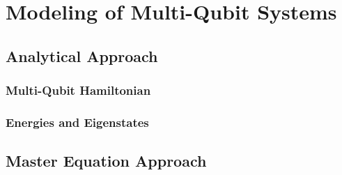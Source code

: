 \chapter{Modeling of Multi-Qubit Systems}


\section{Analytical Approach}

\subsection{Multi-Qubit Hamiltonian}


\subsection{Energies and Eigenstates}


\section{Master Equation Approach}

